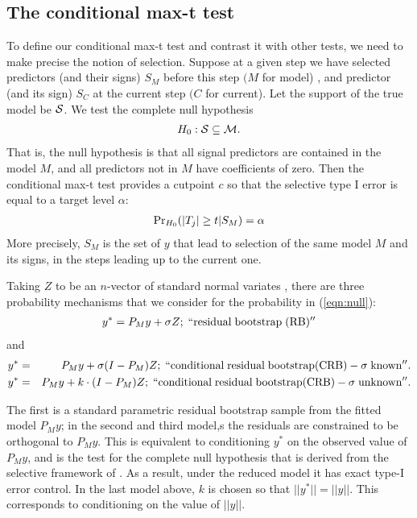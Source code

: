 \documentclass{article}
\def\cS{\mathcal{S}}
\def\cS {\cal S}
\def\Prob{{\rm Pr}}
\begin{document}
\subsection{The conditional max-t test}

To define our conditional max-t test and contrast it with other tests,  we need to make precise the notion of selection.
Suppose at a given step we have selected predictors (and their signs) $S_M$ before this step $(M$ for model) , and predictor (and its sign) $S_C$ at the current step $(C$ for current).
Let the support of the true model be $\cS$.
We test the complete null hypothesis
\begin{eqnarray}
H_0: \cS \subseteq M.
\end{eqnarray}
That is, the null hypothesis is that all signal predictors are contained in the model $M$, and all predictors not in $M$ have coefficients of zero.
Then the conditional max-t test  provides a cutpoint $c$ so that the selective type I error is equal to a target level $\alpha$:
\begin{eqnarray}
\Prob_{H_0} (|T_j| \geq t | S_M)=\alpha
\label{eqn:null}
\end{eqnarray}
More precisely,  $S_M$ is the set of $y$ that lead to selection of the same model $M$ and its signs, in the steps leading up to the current one.

Taking $Z$ to be an $n$-vector of standard normal variates , there are three probability mechanisms that we consider for the probability in (\ref{eqn:null}):
\begin{eqnarray}
y^*=P_My+ \sigma Z;  \;{\rm ``residual} \;{\rm  bootstrap}\;{\rm (RB)''}
\label{eqn:parboot}
\end{eqnarray}
and
\begin{eqnarray}
y^*&=&P_My+ \sigma (I-P_M) Z;  \;{\rm ``conditional}\;{\rm  residual} \;{\rm bootstrap (CRB)}- \sigma \;{\rm known''.} \cr
y^*&=&P_My+ k\cdot (I-P_M) Z;  \;{\rm ``conditional}\;{\rm  residual} \;{\rm bootstrap (CRB)} - \sigma \;{\rm unknown ''.}
\label{eqn:selective}
\end{eqnarray}

The first is a standard parametric residual bootstrap sample from the fitted model $P_M y$;
in the second and third model,s the residuals are constrained  to be orthogonal to $P_My$. This is equivalent to
conditioning $y^*$ on  the observed value of $P_My$, and is the test for the complete null hypothesis that is  derived from the selective framework of \citet{FST2014}.
As a result, under the reduced model it has exact type-I error control.  In the last model above, $k$ is chosen so that $||y^*||= ||y||$.
This corresponds to conditioning on the value of $||y||$.
\end{document}
